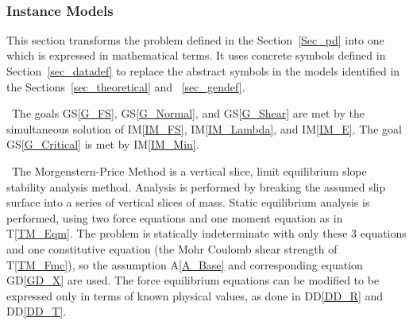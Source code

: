\documentclass[12pt]{article}
\newcommand{\aref}[1]{A\ref{#1}}
\newcommand{\gsref}[1]{GS\ref{#1}}
\newcommand{\tref}[1]{T\ref{#1}}
\newcommand{\iref}[1]{IM\ref{#1}}
\newcommand{\ddref}[1]{DD\ref{#1}}
\newcommand{\dref}[1]{GD\ref{#1}}
\begin{document}
~\newline

\subsubsection{Instance Models} \label{sec_instance}

This section transforms the problem defined in the
Section~\ref{Sec_pd} into one which is expressed in mathematical
terms. It uses concrete symbols defined in Section~\ref{sec_datadef}
to replace the abstract symbols in the models identified in the
Sections~\ref{sec_theoretical} and ~\ref{sec_gendef}.

~\newline\noindent The goals \gsref{G_FS}, \gsref{G_Normal}, and 
\gsref{G_Shear} are met by the simultaneous solution of \iref{IM_FS}, 
\iref{IM_Lambda}, and \iref{IM_E}. The goal \gsref{G_Critical} is met by
\iref{IM_Min}.

~\newline\noindent The Morgenstern-Price Method is a vertical slice,
limit equilibrium slope stability analysis method. Analysis is
performed by breaking the assumed slip surface into a series of
vertical slices of mass. Static equilibrium analysis is performed, using two 
force equations and one moment equation as in \tref{TM_Eqm}. The problem
is statically indeterminate with only these 3 equations and one
constitutive equation (the Mohr Coulomb shear strength of
\tref{TM_Fmc}), so the assumption \aref{A_Base} and corresponding equation 
\dref{GD_X} are used. The force equilibrium equations can be modified to be 
expressed only in terms of known physical values, as done in \ddref{DD_R} and 
\ddref{DD_T}.

~\newline

\end{document}
